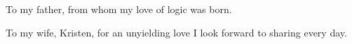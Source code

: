 
To my father, from whom my love of logic was born.

To my wife, Kristen, for an unyielding love I look forward to sharing every day.